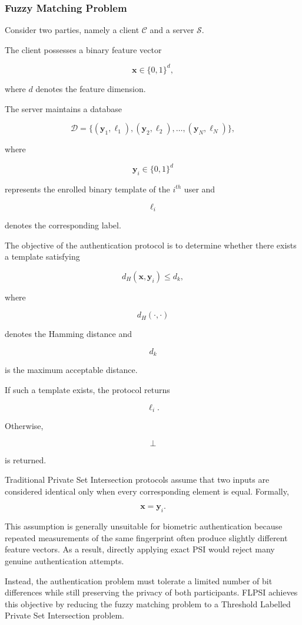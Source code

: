 \documentclass[11pt,a4paper]{article}
\begin{document}
\subsubsection{Fuzzy Matching Problem}

Consider two parties, namely a client
$\mathcal{C}$
and a server
$\mathcal{S}$.

The client possesses a binary feature vector

\[
\mathbf{x}
\in
\{0,1\}^{d},
\]

where $d$ denotes the feature dimension.

The server maintains a database

\[
\mathcal D=
\{
(\mathbf{y}_1,\ell_1),
(\mathbf{y}_2,\ell_2),
\ldots,
(\mathbf{y}_N,\ell_N)
\},
\]

where

\[
\mathbf{y}_i
\in
\{0,1\}^{d}
\]

represents the enrolled binary template of the $i^{th}$ user and

\[
\ell_i
\]

denotes the corresponding label.

The objective of the authentication protocol is to determine whether there exists a template satisfying

\[
d_H(\mathbf{x},\mathbf{y}_i)
\le
d_k,
\]

where

\[
d_H(\cdot,\cdot)
\]

denotes the Hamming distance and

\[
d_k
\]

is the maximum acceptable distance.

If such a template exists, the protocol returns

\[
\ell_i.
\]

Otherwise,

\[
\perp
\]

is returned.

Traditional Private Set Intersection protocols assume that two inputs are considered identical only when every corresponding element is equal. Formally,

\[
\mathbf{x}
=
\mathbf{y}_i.
\]

This assumption is generally unsuitable for biometric authentication because repeated measurements of the same fingerprint often produce slightly different feature vectors. As a result, directly applying exact PSI would reject many genuine authentication attempts.

Instead, the authentication problem must tolerate a limited number of bit differences while still preserving the privacy of both participants. FLPSI achieves this objective by reducing the fuzzy matching problem to a Threshold Labelled Private Set Intersection problem.
\end{document}
